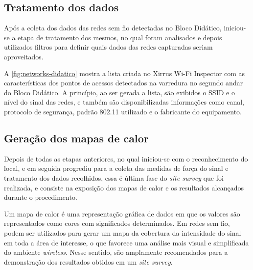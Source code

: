 \subsection{Tratamento dos dados}
\label{subsec:tratamento-dos-dados}

Após a coleta dos dados das redes sem fio detectadas no Bloco Didático, iniciou-se a etapa de tratamento dos mesmos, no qual foram analisados e depois utilizados filtros para definir quais dados das redes capturadas seriam aproveitados.

A \autoref{fig:networks-didatico} mostra a lista criada no Xirrus Wi-Fi Inspector com as características dos pontos de acessos detectados na varredura no segundo andar do Bloco Didático. A princípio, ao ser gerada a lista, são exibidos o SSID e o nível do sinal das redes, e também são disponibilizadas informações como canal, protocolo de segurança, padrão 802.11 utilizado e o fabricante do equipamento.

\begin{figure}[H]
	\centering
\end{figure}

\subsection{Geração dos mapas de calor}
\label{subsec:mapas-de-calor}

Depois de todas as etapas anteriores, no qual iniciou-se com o reconhecimento do local, e em seguida progrediu para a coleta das medidas de força do sinal e tratamento dos dados recolhidos, essa é última fase do \textit{site survey} que foi realizada, e consiste na exposição dos mapas de calor e os resultados alcançados durante o procedimento.

Um mapa de calor é uma representação gráfica de dados em que os valores são representados como cores com significados determinados. Em redes sem fio, podem ser utilizados para gerar um mapa da cobertura da intensidade do sinal em toda a área de interesse, o que favorece uma análise mais visual e simplificada do ambiente \textit{wireless}. Nesse sentido, são amplamente recomendados para a demonstração dos resultados obtidos em um \textit{site survey}.

